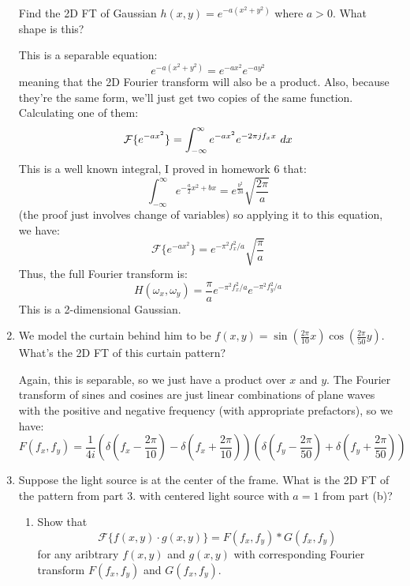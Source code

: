 \documentclass[10pt]{article}
\begin{document}
\begin{enumerate}[label=\alph*)]
			Find the 2D FT of Gaussian \( h(x, y) = e^{-a(x^2 + y^2)} \) where \( a > 0 \). What 
			shape is this? 

			\begin{solution}
				This is a separable equation:
				\[
				e^{-a(x^2 + y^2)} = e^{-ax^2} e^{-ay^2}
				\] 
				meaning that the 2D Fourier transform will also be a product. Also, because they're the same form, 
				we'll just get two copies of the same function. Calculating one of them:
				\[
				\mathcal F \{e^{-ax^2}\}  = \int_{-\infty}^{\infty} e^{-ax^2}e^{-2 \pi j f_x x} \ d x 
				\] 
				This is a well known integral, I proved in homework 6 that:
				\[
				\int_{-\infty}^{\infty} e^{-\frac{a}{2}x^2 + bx} = e^{\frac{b^2}{2a}}\sqrt{\frac{2\pi}{a}}  
				\] 
				(the proof just involves change of variables) so applying it to this equation, we have:
				\[
				\mathcal F \{e^{-ax^2}\} = e^{-\pi^2 f_x^2 / a}\sqrt{\frac{\pi}{a}} 
				\] 
				Thus, the full Fourier transform is:
				\[
				H(\omega_x, \omega_y) =\frac{\pi}{a} e^{-\pi^2 f_x^2 / a}e^{-\pi^2 f_y^2 / a}
				\] 
				This is a 2-dimensional Gaussian. 
			\end{solution}
		\item We model the curtain behind him to be \( f(x,y) = \sin(\frac{2\pi}{10} x) \cos(\frac{2\pi}{50} y) \).
			What's the 2D FT of this curtain pattern?

			\begin{solution}
				Again, this is separable, so we just have a product over \( x \) and \( y \). The Fourier 
				transform of sines and cosines are just linear combinations of plane 
				waves with the positive and negative 
				frequency (with appropriate prefactors), so we have:
				\[
					F(f_x, f_y) = \frac{1}{4i}\left( \delta\left(f_x - \frac{2\pi}{10}\right) - 
				\delta\left( f_x + \frac{2\pi}{10} \right) \right) 
				\left( \delta\left( f_y- \frac{2\pi}{50} \right) + 
				\delta\left( f_y + \frac{2\pi}{50} \right)  \right) 
				\] 
			\end{solution}
		\item Suppose the light source is at the center of the frame. What is the 2D FT of the pattern from 
			part 3. with centered light source with \( a = 1 \) from part (b)?
			\begin{enumerate}[label=\roman*)]
				\item Show that 
					\[
					\mathcal F \{f(x, y) \cdot g(x, y) \}  = F(f_x, f_y) * G(f_x, f_y)
					\] 
					for any aribtrary \( f(x, y) \) and \( g(x, y) \) with corresponding Fourier 
					transform \( F(f_x, f_y) \) and \( G(f_x, f_y) \). 


\end{enumerate}
\end{enumerate}
\end{document}
